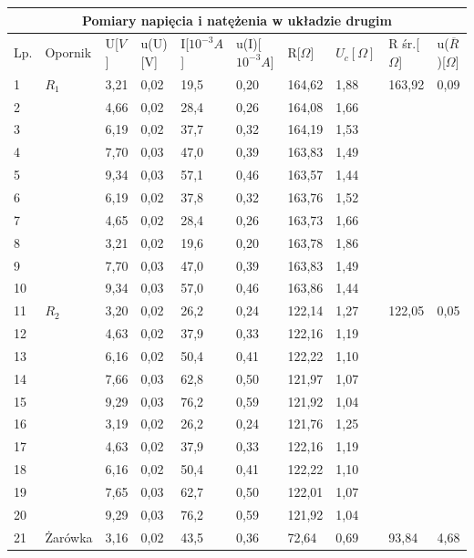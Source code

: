 \documentclass[12pt]{article}
\begin{document}
\begin{adjustbox}{center}
\begin{tabular}{|p{0.5cm}|p{1.5cm}|p{1cm}|p{1.5cm}|p{1.5cm}|p{2cm}|p{1.3cm}|p{1.2cm}|p{1.5cm}|p{1.5cm}|}
    
    \hline
    \multicolumn{10}{|c|}{Pomiary napięcia i natężenia w układzie drugim} \\
    \hline
    Lp. & Opornik& U[$V$]& u(U)[V] & I[$10^{-3}A$] & u(I)[$10^{-3}A$] & R[$\Omega$] & $U_c[\Omega]$ & R śr.[$\Omega$] & u($\overline{R}$)[$\Omega$] \\ 
    \hline
    1 & $R_1$ & 3,21 & 0,02 & 19,5 & 0,20 & 164,62 & 1,88 & 163,92 & 0,09\\
    2 && 4,66 & 0,02 & 28,4 & 0,26 & 164,08& 1,66 && \\
    3 && 6,19 & 0,02& 37,7 & 0,32 & 164,19& 1,53 && \\
    4 && 7,70 & 0,03& 47,0 & 0,39 & 163,83& 1,49 && \\
    5 && 9,34 & 0,03& 57,1 & 0,46 & 163,57& 1,44&& \\
    6 && 6,19 & 0,02& 37,8 & 0,32 & 163,76& 1,52&& \\
    7 && 4,65 & 0,02& 28,4 & 0,26 & 163,73& 1,66&& \\
    8 && 3,21 & 0,02& 19,6 & 0,20 & 163,78& 1,86&& \\
    9 && 7,70 & 0,03& 47,0 & 0,39 & 163,83& 1,49&& \\
    10 && 9,34 & 0,03 & 57,0 & 0,46 & 163,86& 1,44&& \\
    \hline
    11 & $R_2$ & 3,20 & 0,02 & 26,2 & 0,24 & 122,14 & 1,27 & 122,05 & 0,05 \\
    12 && 4,63 & 0,02 & 37,9 & 0,33 & 122,16& 1,19 && \\
    13 && 6,16 & 0,02 & 50,4 & 0,41 & 122,22& 1,10 && \\
    14 && 7,66 & 0,03 & 62,8 & 0,50 & 121,97& 1,07 && \\
    15 && 9,29 & 0,03 & 76,2 & 0,59 & 121,92& 1,04 && \\
    16 && 3,19 & 0,02 & 26,2 & 0,24 & 121,76& 1,25 && \\
    17 && 4,63 & 0,02 & 37,9 & 0,33 & 122,16& 1,19 && \\
    18 && 6,16 & 0,02 & 50,4 & 0,41 & 122,22& 1,10 && \\
    19 && 7,65 & 0,03 & 62,7 & 0,50 & 122,01& 1,07 && \\
    20 && 9,29 & 0,03 & 76,2 & 0,59 & 121,92& 1,04 && \\
    \hline
    21 & Żarówka & 3,16 & 0,02 & 43,5 & 0,36 & 72,64 & 0,69 & 93,84 & 4,68 \\

\end{tabular}
\end{adjustbox}
\end{document}
